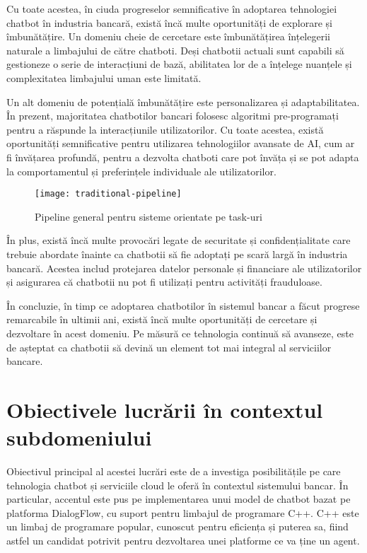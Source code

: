 Cu toate acestea, în ciuda progreselor semnificative în adoptarea tehnologiei chatbot în industria bancară, există încă multe oportunități de explorare și îmbunătățire. Un domeniu cheie de cercetare este îmbunătățirea înțelegerii naturale a limbajului de către chatboti. Deși chatbotii actuali sunt capabili să gestioneze o serie de interacțiuni de bază, abilitatea lor de a înțelege nuanțele și complexitatea limbajului uman este limitată.

Un alt domeniu de potențială îmbunătățire este personalizarea și adaptabilitatea. În prezent, majoritatea chatbotilor bancari folosesc algoritmi pre-programați pentru a răspunde la interacțiunile utilizatorilor. Cu toate acestea, există oportunități semnificative pentru utilizarea tehnologiilor avansate de AI, cum ar fi învățarea profundă, pentru a dezvolta chatboti care pot învăța și se pot adapta la comportamentul și preferințele individuale ale utilizatorilor.

\begin{figure}[h] %
    \centering
    \texttt{[image: traditional-pipeline]}
    \caption{Pipeline general pentru sisteme orientate pe task-uri \cite{chen_liu_yin_tang_dialogue_2017}}
    \label{fig:traditional-pipeline}
\end{figure}

În plus, există încă multe provocări legate de securitate și confidențialitate care trebuie abordate înainte ca chatbotii să fie adoptați pe scară largă în industria bancară. Acestea includ protejarea datelor personale și financiare ale utilizatorilor și asigurarea că chatbotii nu pot fi utilizați pentru activități frauduloase.

În concluzie, în timp ce adoptarea chatbotilor în sistemul bancar a făcut progrese remarcabile în ultimii ani, există încă multe oportunități de cercetare și dezvoltare în acest domeniu. Pe măsură ce tehnologia continuă să avanseze, este de așteptat ca chatbotii să devină un element tot mai integral al serviciilor bancare.

\section{Obiectivele lucrării în contextul subdomeniului}

Obiectivul principal al acestei lucrări este de a investiga posibilitățile pe care tehnologia chatbot și serviciile cloud le oferă în contextul sistemului bancar. În particular, accentul este pus pe implementarea unui model de chatbot bazat pe platforma DialogFlow, cu suport pentru limbajul de programare C++. C++ este un limbaj de programare popular, cunoscut pentru eficiența și puterea sa, fiind astfel un candidat potrivit pentru dezvoltarea unei platforme ce va ține un agent.

